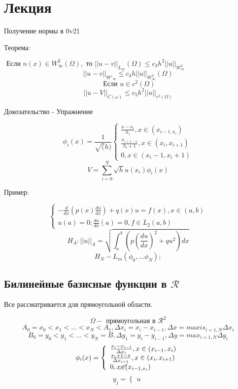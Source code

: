 \documentclass[12pt, a4paper]{article}
\begin{document}
\section{Лекция}

Получение нормы в 0v21

Теорема:

$ \textrm{ Если } n(x) \in W^2_{\infty} (\Omega), \textrm{ то } {||u-v||}_{L_{\infty}}(\Omega) \leq c_3 h^2 {||u||}_{W^2_{\infty}}$
\[ || u-v ||_{W'_{\infty}} \leq c_4 h ||u||_{W^2_{\infty}}(\Omega)\]
\[ \textrm{ Если } u \in c^2 (\Omega) \]
\[ {||u-V||}_{C(\omega)} \leq c_5 h^2 {||u||}_{c^2(\Omega)} \]

Докозательство - Упражнение

\[ \phi_i(x) = \frac{1}{\sqrt(h)}
\left\{
\begin{array}{l}
    \frac{x-x_i}{h_i}, x \in (x_{i-1, x_i}) \\
    \frac{x_{i+1-x}}{h_i+1}, x \in (x_i, x_{i+1}) \\
    0, x \in (x_i-1, x_i+1)
\end{array}
\right.
\]
\[ V = \sum_{i=0}^{N} \sqrt{h} u(x_i) \phi_i(x) \]

Пример:

\[
\left\{
\begin{array}{l}
    - \frac{d}{dx}(p(x) \frac{du}{dx}) + q(x) u = f(x), x \in (a, b) \\
    u(a) = 0; \frac{du}{dx}(a) = 0, f \in L_2(a, b)
\end{array}
\right.
\]
\[ H_A: {||u||}_A = \sqrt{\int_{a}^{b} (p (\frac{du}{dx})^2+qu^2) dx} \]
\[ H_N - L_{in} (\phi_0, ... \phi_N); \]

\subsection{Билинейные базисные функции в $\mathcal{R}$}

Все рассматривается для прямоугольной области.

\[ \Omega - \textrm{ прямоугольная в  } \mathcal{R^2}\]
\[ A_0 = x_0 < x_1 < ... < x_N < A_1, \Delta x_i = x_i - x_{i-1}, \Delta x = maxis_{i=1, N} \Delta x_i \]
\[ B_0 = y_0 < y_1 < ... < y_N = B, \Delta y_1 = y_i - y_{i-1}, \Delta y = {max}_{i = 1, N} \Delta y_i \]
\[ \phi_i(x) =
\left\{
\begin{array}{l}
    \frac{x_i - x_{i-1}}{\Delta x_i}, x \in (x_{i-1}, x_i) \\
    \frac{x_i+1 - x}{\Delta x_{i+1}}, x \in (x_i, x_{i+1}) \\
    0, x \cancel{\in} (x_{i-1, x_i})
\end{array}
\right.
\]
\[
y_j =
\left\{
\begin{array}{l}
    u
\end{array}
\right.
\]
\end{document}
